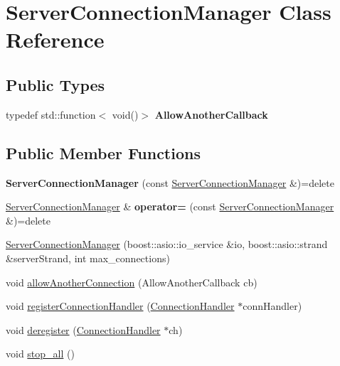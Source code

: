 \hypertarget{class_server_connection_manager}{}\section{Server\+Connection\+Manager Class Reference}
\label{class_server_connection_manager}
\subsection*{Public Types}
\begin{DoxyCompactItemize}
\item 
\mbox{\label{class_server_connection_manager_a28eaf417682341e6f8c733b30c59bbd8}} 
typedef std\+::function$<$ void()$>$ {\bfseries Allow\+Another\+Callback}
\end{DoxyCompactItemize}
\subsection*{Public Member Functions}
\begin{DoxyCompactItemize}
\item 
\mbox{\label{class_server_connection_manager_a8f20818d0fd29612ce09f694aaad0271}} 
{\bfseries Server\+Connection\+Manager} (const \hyperlink{class_server_connection_manager}{Server\+Connection\+Manager} \&)=delete
\item 
\mbox{\label{class_server_connection_manager_a3193017398278086cb7d79820987c5e2}} 
\hyperlink{class_server_connection_manager}{Server\+Connection\+Manager} \& {\bfseries operator=} (const \hyperlink{class_server_connection_manager}{Server\+Connection\+Manager} \&)=delete
\item 
\hyperlink{class_server_connection_manager_a0b2c91c8c5f07706cbec0bb08de8039d}{Server\+Connection\+Manager} (boost\+::asio\+::io\+\_\+service \&io, boost\+::asio\+::strand \&server\+Strand, int max\+\_\+connections)
\item 
void \hyperlink{class_server_connection_manager_a9661756cbecdbec901860ffec5cf6e47}{allow\+Another\+Connection} (Allow\+Another\+Callback cb)
\item 
void \hyperlink{class_server_connection_manager_aa2c03c50b5154af1424ed92a35cd6389}{register\+Connection\+Handler} (\hyperlink{class_connection_handler}{Connection\+Handler} $\ast$conn\+Handler)
\item 
void \hyperlink{class_server_connection_manager_a61073d71f21045b5202fa035e9da282f}{deregister} (\hyperlink{class_connection_handler}{Connection\+Handler} $\ast$ch)
\item 
void \hyperlink{class_server_connection_manager_a83a3b22ce780b4762ad06e7f2ffbb611}{stop\+\_\+all} ()
\end{DoxyCompactItemize}
